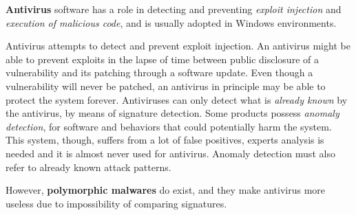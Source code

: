 \documentclass[10pt]{extbook}
\begin{document}
\textbf{Antivirus} software has a role in detecting and preventing
\emph{exploit injection} and \emph{execution of malicious code}, and is usually
adopted in Windows environments.

Antivirus attempts to detect and prevent exploit injection. An antivirus might
be able to prevent exploits in the lapse of time between public disclosure of a
vulnerability and its patching through a software update. Even though a
vulnerability will never be patched, an antivirus in principle may be able to
protect the system forever. Antiviruses can only detect what is \emph{already
known} by the antivirus, by means of signature detection. Some products possess
\emph{anomaly detection}, for software and behaviors that could potentially
harm the system. This system, though, suffers from a lot of false positives,
experts analysis is needed and it is almost never used for antivirus. Anomaly
detection must also refer to already known attack patterns.

However, \textbf{polymorphic malwares} do exist, and they make antivirus
more useless due to impossibility of comparing signatures.
\end{document}
